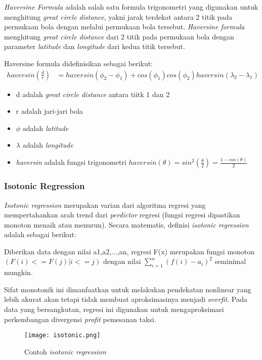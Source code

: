 \documentclass{article}
\begin{document}
\begin{adjustwidth}{4em}{0pt}
	
\hspace{\parindent}\textit{Haversine Formula} adalah salah satu formula trigonometri yang digunakan untuk menghitung \textit{great circle distance}, yakni jarak terdekat antara 2 titik pada permukaan bola dengan melalui permukaan bola tersebut. \textit{Haversine formula} menghitung \textit{great circle distance} dari 2 titik pada permukaan bola dengan parameter \textit{latitude} dan \textit{longitude} dari kedua titik tersebut.

Haversine formula didefinisikan sebagai berikut:
\begin{align*}
haversin(\frac{d}{r}) &= haversin(\phi _{2} - \phi _{1}) + cos(\phi _{1})cos(\phi _{2})haversin(\lambda _{2} - \lambda _{1})
\end{align*}
\begin{itemize}
	\setlength{\itemindent}{1cm}
	\item{d adalah \textit{great circle distance} antara tiitk 1 dan 2}
	\item{r adalah jari-jari bola}
	\item{$\phi$ adalah \textit{latitude}}
	\item{$\lambda$ adalah \textit{longitude}}
	\item{\textit{haversin} adalah fungsi trigonometri $haversin(\theta) = sin^2(\frac{\theta}{2}) = \frac{1-cos(\theta)}{2}$}
\end{itemize}

\end{adjustwidth}

\subsubsection{Isotonic Regression}
\begin{adjustwidth}{4em}{0pt}
	
\hspace{\parindent}\textit{Isotonic regression} merupakan varian dari algoritma regresi yang mempertahankan arah trend dari \textit{perdictor} regresi (fungsi regresi dipastikan monoton menaik atau menurun). Secara matematis, definisi \textit{isotonic regression} adalah sebagai berikut:

Diberikan data dengan nilai a1,a2,...,an, regresi F(x) merupakan fungsi monoton $(F(i) <= F(j) | i <= j)$  dengan nilai $\sum\limits_{i=1}^n({f(i)-a_{i}})^2$ seminimal mungkin.

Sifat monotonik ini dimanfaatkan untuk melakukan pendekatan  nonlinear yang lebih akurat akan tetapi tidak membuat aproksimasinya menjadi \textit{overfit}. Pada data yang bersangkutan, regresi ini digunakan untuk mengaproksimasi perkembangan divergensi \textit{profit} pemesanan taksi.

\begin{figure}[H]
	\texttt{[image: isotonic.png]}
	\caption{Contoh \textit{isotonic regression}}
\end{figure}

\end{adjustwidth}
\end{document}
